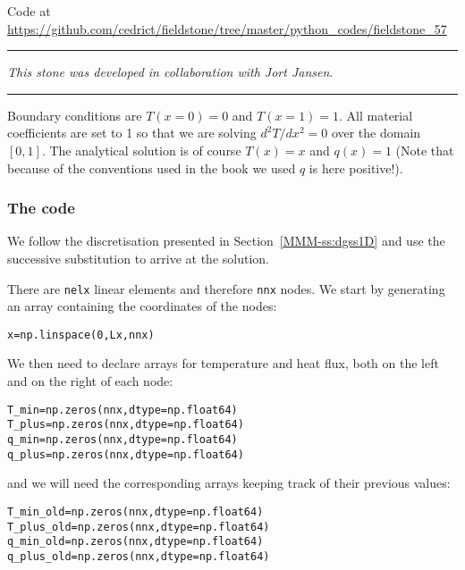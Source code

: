 

\begin{center}
Code at \url{https://github.com/cedrict/fieldstone/tree/master/python_codes/fieldstone_57}
\end{center}

\par\noindent\rule{\textwidth}{0.4pt}

{\sl This stone was developed in collaboration with Jort Jansen}. 

\par\noindent\rule{\textwidth}{0.4pt}


Boundary conditions are $T(x=0)=0$ and $T(x=1)=1$. All material coefficients are set to 1
so that we are solving $d^2T/dx^2=0$ over the domain $[0,1]$. The analytical solution is 
of course $T(x)=x$ and $q(x)=1$ (Note that because of the conventions used in the book 
we used $q$ is here positive!). 

\subsubsection*{The code}

We follow the discretisation presented in Section~\ref{MMM-ss:dgss1D} and use the 
successive substitution to arrive at the solution. 

There are {\tt nelx} linear elements and therefore {\tt nnx} nodes.
We start by generating an array containing the coordinates of the nodes:
\begin{lstlisting}
x=np.linspace(0,Lx,nnx)
\end{lstlisting}
We then need to declare arrays for temperature and heat flux, both on the left and on the right of 
each node:
\begin{lstlisting}
T_min=np.zeros(nnx,dtype=np.float64)       
T_plus=np.zeros(nnx,dtype=np.float64)      
q_min=np.zeros(nnx,dtype=np.float64)       
q_plus=np.zeros(nnx,dtype=np.float64)
\end{lstlisting}
and we will need the corresponding arrays keeping track of their previous values:
\begin{lstlisting}
T_min_old=np.zeros(nnx,dtype=np.float64)    
T_plus_old=np.zeros(nnx,dtype=np.float64)   
q_min_old=np.zeros(nnx,dtype=np.float64)    
q_plus_old=np.zeros(nnx,dtype=np.float64)
\end{lstlisting}

